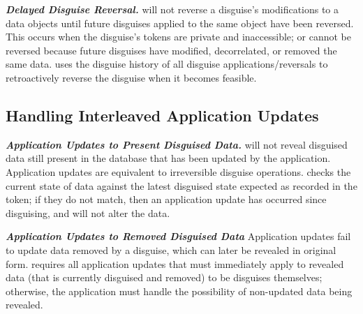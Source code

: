 \vspace{6pt}\noindent\textbf{\emph{Delayed Disguise Reversal.}}
\sys will not reverse a disguise's modifications to a data objects until future disguises applied to
the same object have been reversed.
This occurs when the disguise's tokens are private and inaccessible; or cannot be reversed because
future disguises have modified, decorrelated, or removed the same data.
\sys uses the disguise history of all disguise applications/reversals to retroactively reverse
the disguise when it becomes feasible.

\subsection{Handling Interleaved Application Updates}
\noindent\textbf{\emph{Application Updates to Present Disguised Data.}}
\sys will not reveal disguised data still present in the database that has been updated by the
application. Application updates are equivalent to irreversible disguise operations.
\sys checks the current state of data against the latest disguised state
expected as recorded in the token; if they do not match, then an application update has occurred
since disguising, and \sys will not alter the data.

\vspace{6pt}\noindent\textbf{\emph{Application Updates to Removed Disguised Data}}
Application updates fail to update data removed by a disguise, which can later be revealed in
original form.
\sys requires all application updates that must immediately apply to revealed data (that is
currently disguised and removed) to be disguises themselves; otherwise, the application must handle
the possibility of non-updated data being revealed.



